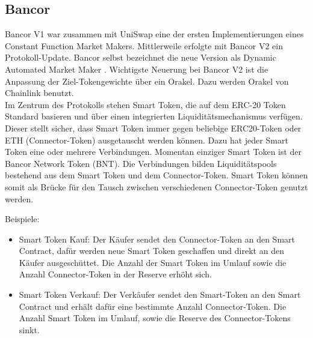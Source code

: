 \documentclass[12pt,a4paper,titlepage,oneside,english]{article}
\begin{document}
\subsection{Bancor}
Bancor V1 war zusammen mit UniSwap eine der ersten Implementierungen eines Constant Function Market Makers. Mittlerweile erfolgte mit Bancor V2 ein Protokoll-Update. Bancor selbst bezeichnet die neue Version als Dynamic Automated Market Maker \citep{Bancor2020}.
Wichtigste Neuerung bei Bancor V2 ist die Anpassung der Ziel-Tokengewichte über ein Orakel. Dazu werden Orakel von Chainlink benutzt. \citep{Chainlink2020}\\
Im Zentrum des Protokolls stehen Smart Token, die auf dem ERC-20 Token Standard basieren und über einen integrierten Liquiditätsmechanismus verfügen. Dieser stellt sicher, dass Smart Token immer gegen beliebige ERC20-Token oder ETH (Connector-Token) ausgetauscht werden können.  Dazu hat jeder Smart Token eine oder mehrere Verbindungen. Momentan einziger Smart Token ist der Bancor Network Token (BNT). 
Die Verbindungen bilden Liquiditätspools bestehend aus dem Smart Token und dem Connector-Token.
Smart Token können somit als Brücke für den Tausch zwischen verschiedenen Connector-Token genutzt werden. \citep[vgl.][S.5]{Hertzog2018}

Beispiele:
\begin{itemize}
  \item{Smart Token Kauf: Der Käufer sendet den Connector-Token an den Smart Contract, dafür werden neue Smart Token geschaffen und direkt an den Käufer ausgeschüttet. Die Anzahl der Smart Token im Umlauf sowie die Anzahl Connector-Token in der Reserve erhöht sich.}
  \item{Smart Token Verkauf: Der Verkäufer sendet den Smart-Token an den Smart Contract und erhält dafür eine bestimmte Anzahl Connector-Token. Die Anzahl Smart Token im Umlauf, sowie die Reserve des Connector-Tokens sinkt. }
\end{itemize}
\citep[vgl.][S.5f.]{Hertzog2018}\\
\end{document}

